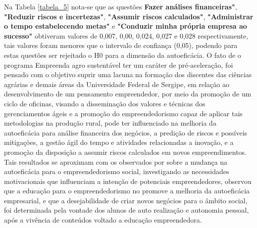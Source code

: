 Na Tabela \ref{tabela_5} nota-se que as questões \textbf{Fazer análises financeiras"}, \textbf{"Reduzir riscos e incertezas"}, \textbf{"Assumir riscos calculados"}, \textbf{"Administrar o tempo estabelecendo metas"} e \textbf{"Conduzir minha própria empresa ao sucesso"} obtiveram valores de 0,007, 0,00, 0,024, 0,027 e 0,028 respectivamente, tais valores foram menores que o intervalo de confiança (0,05), podendo para estas questões ser rejeitado o H0 para a dimensão da autoeficácia. O fato de o programa Empreenda agro sustentável ter um caráter de pré-aceleração, foi pensado com o objetivo suprir uma lacuna na formação dos discentes das ciências agrárias e demais áreas da Universidade Federal de Sergipe, em relação ao desenvolvimento de um pensamento empreendedor, por meio da promoção de um ciclo de oficinas, visando a disseminação dos valores e técnicas dos gerenciamentos ágeis e a promoção do empreendedorismo capaz de aplicar tais metodologias na produção rural, pode ter influenciado na melhoria da autoeficácia para análise financeira dos negócios, a predição de riscos e possíveis mitigações, a gestão ágil do tempo e atividades relacionadas a inovação, e a promoção da disposição a assumir riscos calculados em novos empreendimentos. Tais resultados se aproximam com os observados por  sobre a mudança na autoeficácia para o empreendedorismo social, investigando as necessidades motivacionais que influenciam a intenção de potenciais empreendedores, observou que a educação para o empreendedorismo no promove a melhoria da autoeficácia empresarial, e que a desejabilidade de criar novos negócios para o âmbito social, foi determinada pela vontade dos alunos de auto realização e autonomia pessoal, após a vivência de conteúdos voltado a educação empreendedora. 




